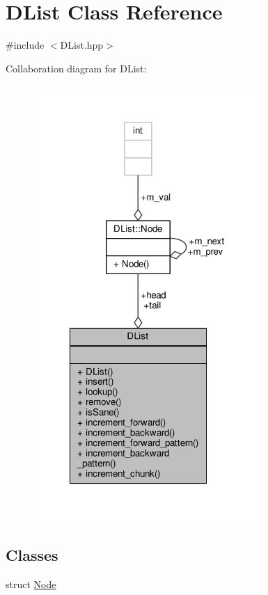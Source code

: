 \hypertarget{classDList}{\section{D\-List Class Reference}
\label{classDList}
}


{\ttfamily \#include $<$D\-List.\-hpp$>$}



Collaboration diagram for D\-List\-:
\nopagebreak
\begin{figure}[H]
\begin{center}
\leavevmode
\includegraphics[width=247pt]{classDList__coll__graph}
\end{center}
\end{figure}
\subsection*{Classes}
\begin{DoxyCompactItemize}
\item 
struct \hyperlink{structDList_1_1Node}{Node}
\end{DoxyCompactItemize}
